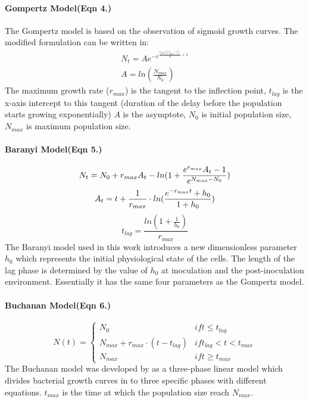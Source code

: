 \documentclass[a4paper,11pt]{article}
\theoremstyle{definition}
\begin{document}
\begin{linenumbers}
\paragraph{Gompertz Model(Eqn 4.)}
The Gompertz model \citep{gibson1988predicting} is based on the observation of sigmoid growth curves. The modified formulation can be written in: 
\begin{align}
    N_t = Ae^{-e^{\frac{r_{max}e(t_{lag}-t)}{A}+1}}\\
    A=ln(\frac{N_{max}}{N_0})
\end{align}
The maximum growth rate ($r_{max}$) is the tangent to the inflection point, $t_{lag}$ is the x-axis intercept to this tangent (duration of the delay before the population starts growing exponentially) $A$ is the asymptote, $N_0$ is initial population size, $N_{max}$ is maximum population size.
\paragraph{Baranyi Model(Eqn 5.)}
\begin{equation}
    N_t = N_0 + r_{max}A_t - ln(1+\frac{e^{r_{max}}A_t-1}{e^{N_{max}-N_0}})\\
\end{equation}
\begin{equation}
    A_t = t + \frac{1}{r_{max}}\cdot ln(\frac{e^{-r_{max}t}+h_0}{1+h_0})\\
\end{equation}
\begin{equation}
    t_{lag} = \frac{ln(1+\frac{1}{h_0})}{r_{max}}
\end{equation}
The Baranyi model used in this work introduces a new dimensionless parameter $h_0$ which represents the initial physiological state of the cells. The length of the lag phase is determined by the value of $h_0$ at inoculation and the post-inoculation environment. Essentially it has the same four parameters as the Gompertz model.
\paragraph{Buchanan Model(Eqn 6.)}
\begin{equation}
    N(t)=\left\{\begin{matrix}
N_0 & if  t\leq t_{lag} \\ N_{max} + r_{max}\cdot (t-t_{lag})
 & if t_{lag} < t < t_{max} \\N_{max}
 & if t\geq t_{max} 
\end{matrix}\right.
\end{equation}
The Buchanan model was developed by \citealp{buchanan1997simple} as a three-phase linear model which divides bacterial growth curves in to three specific phases with different equations. $t_{max}$ is the time at which the population size reach $N_{max}$.


\end{linenumbers}
\end{document}
